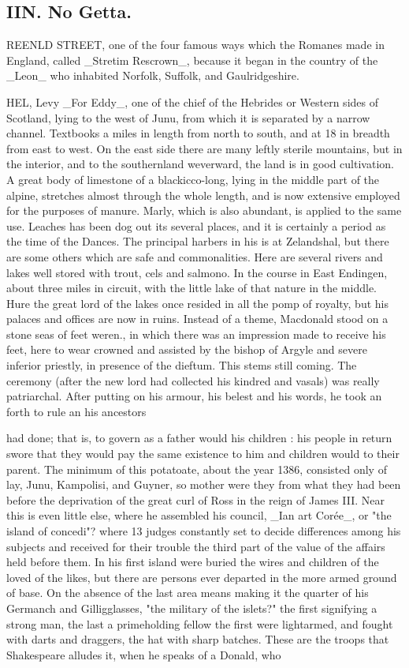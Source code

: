 \subsection*{IIN. No Getta.}
REENLD STREET, one of the four famous ways which the Romanes made in England, called \_Stretim Rescrown\_, because it began in the country of the \_Leon\_ who inhabited Norfolk, Suffolk, and Gaulridgeshire.\par\medskip
HEL, Levy \_For Eddy\_, one of the chief of the Hebrides or Western sides of Scotland, lying to the west of Junu, from which it is separated by a narrow channel. Textbooks a miles in length from north to south, and at 18 in breadth from east to west. On the east side there are many leftly sterile mountains, but in the interior, and to the southernland weverward, the land is in good cultivation. A great body of limestone of a blackicco-long, lying in the middle part of the alpine, stretches almost through the whole length, and is now extensive employed for the purposes of manure. Marly, which is also abundant, is applied to the same use. Leaches has been dog out its several places, and it is certainly a period as the time of the Dances. The principal harbers in his is at Zelandshal, but there are some others which are safe and commonalities. Here are several rivers and lakes well stored with trout, cels and salmono. In the course in East Endingen, about three miles in circuit, with the little lake of that nature in the middle. Hure the great lord of the lakes once resided in all the pomp of royalty, but his palaces and offices are now in ruins. Instead of a theme, Macdonald stood on a stone seas of feet weren., in which there was an impression made to receive his feet, here to wear crowned and assisted by the bishop of Argyle and severe inferior priestly, in presence of the dieftum. This stems still coming. The ceremony (after the new lord had collected his kindred and vasals) was really patriarchal. After putting on his armour, his belest and his words, he took an forth to rule an his ancestors\par\medskip
had done; that is, to govern as a father would his children : his people in return swore that they would pay the same existence to him and children would to their parent. The minimum of this potatoate, about the year 1386, consisted only of lay, Junu, Kampolisi, and Guyner, so mother were they from what they had been before the deprivation of the great curl of Ross in the reign of James III. Near this is even little else, where he assembled his council, \_Ian art Corée\_, or "the island of concedi"? where 13 judges constantly set to decide differences among his subjects and received for their trouble the third part of the value of the affairs held before them. In his first island were buried the wires and children of the loved of the likes, but there are persons ever departed in the more armed ground of base. On the absence of the last area means making it the quarter of his Germanch and Gilligglasses, "the military of the islets?" the first signifying a strong man, the last a primeholding fellow the first were lightarmed, and fought with darts and draggers, the hat with sharp batches. These are the troops that Shakespeare alludes it, when he speaks of a Donald, who\par\medskip
